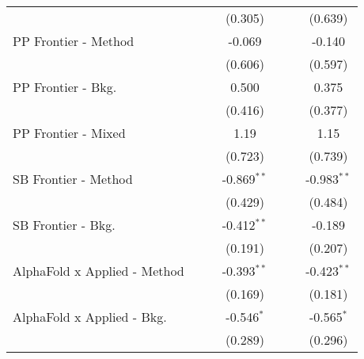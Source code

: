 \begin{tabular}{lcccccc}
                                  &                &                & (0.305)       &                &                & (0.639)\\   
   PP Frontier - Method           &                &                & -0.069        &                &                & -0.140\\   
                                  &                &                & (0.606)       &                &                & (0.597)\\   
   PP Frontier - Bkg.             &                &                & 0.500         &                &                & 0.375\\   
                                  &                &                & (0.416)       &                &                & (0.377)\\   
   PP Frontier - Mixed            &                &                & 1.19          &                &                & 1.15\\   
                                  &                &                & (0.723)       &                &                & (0.739)\\   
   SB Frontier - Method           &                &                & -0.869$^{**}$ &                &                & -0.983$^{**}$\\   
                                  &                &                & (0.429)       &                &                & (0.484)\\   
   SB Frontier - Bkg.             &                &                & -0.412$^{**}$ &                &                & -0.189\\   
                                  &                &                & (0.191)       &                &                & (0.207)\\   
   AlphaFold x Applied - Method   &                &                & -0.393$^{**}$ &                &                & -0.423$^{**}$\\   
                                  &                &                & (0.169)       &                &                & (0.181)\\   
   AlphaFold x Applied - Bkg.     &                &                & -0.546$^{*}$  &                &                & -0.565$^{*}$\\   
                                  &                &                & (0.289)       &                &                & (0.296)\\   

\end{tabular}
